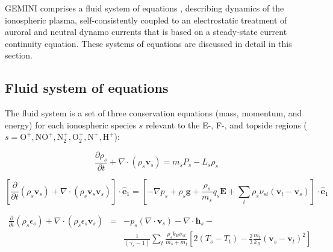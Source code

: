 \documentclass[11pt,letterpaper]{article}
\begin{document}
GEMINI comprises a fluid system of equations \citep{Schunk:1977,Blelly:1993,Huba:2000}, describing dynamics of the ionospheric plasma, self-consistently coupled to an electrostatic treatment of auroral and neutral dynamo currents that is based on a steady-state current continuity equation.  These systems of equations are discussed in detail in this section.  


\subsection{Fluid system of equations}

The fluid system is a set of three conservation equations (mass, momentum, and energy) for each ionospheric species $s$ relevant to the E-, F-, and topside regions ($s=\mathrm{O^+,NO^+,N_2^+,O_2^+,N^+,H^+}$):
\begin{linenomath*} \begin{equation}
\frac{\partial \rho_s}{\partial t} + \nabla \cdot \left( \rho_s \mathbf{v}_s \right) = m_s P_s - L_s \rho_s \label{continuity}
\end{equation} \end{linenomath*}
\begin{linenomath*} \begin{equation}
\left[ \frac{\partial }{\partial t} \left( \rho_s \mathbf{v}_s \right) + \nabla \cdot \left( \rho_s \mathbf{v}_s \mathbf{v}_s \right) \right] \cdot \hat{\mathbf{e}}_1 = \left[ -\nabla p_s + \rho_s \mathbf{g} + \frac{\rho_s} {m_s} q_s \mathbf{E} + \sum_t \rho_s \nu_{st} \left(\mathbf{v}_t - \mathbf{v}_s \right) \right] \cdot \hat{\mathbf{e}}_1 \label{momentum}
\end{equation} \end{linenomath*}
\begin{linenomath*} \begin{eqnarray}
\frac{\partial}{\partial t} \left( \rho_s \epsilon_s \right) + \nabla \cdot \left( \rho_s \epsilon_s \mathbf{v}_s \right) &=& - p_s (\nabla \cdot \mathbf{v}_s) - \nabla \cdot \mathbf{h}_s - \\
\nonumber&& \frac{1}{(\gamma_s - 1 )}\sum_t \frac{\rho_s k_B \nu_{st}}{m_s + m_t}\left[ 2 (T_s-T_t) - \frac{2}{3} \frac{m_t}{k_B}(\mathbf{v}_s-\mathbf{v}_t)^2 \right] \label{energy}
\end{eqnarray} \end{linenomath*}
\end{document}
